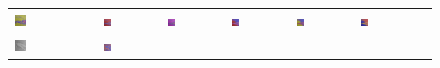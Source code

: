 \begin{figure}[h!]
\begin{tabular}{C{0.14\textwidth}C{0.14\textwidth}C{0.14\textwidth}C{0.14\textwidth}C{0.14\textwidth}C{0.14\textwidth}C{0.14\textwidth}}
		\includegraphics[width=0.14\textwidth]{images/gen/color_weight/p03_02.png_0.00.png} &
		\includegraphics[width=0.14\textwidth]{images/gen/color_weight/p03_02.png_0.33.png} &
		\includegraphics[width=0.14\textwidth]{images/gen/color_weight/p03_02.png_0.66.png} &
		\includegraphics[width=0.14\textwidth]{images/gen/color_weight/p03_02.png_1.00.png} &
		\includegraphics[width=0.14\textwidth]{images/gen/color_weight/p03_02.png_1.33.png} &
		\includegraphics[width=0.14\textwidth]{images/gen/color_weight/p03_02.png_1.66.png} \\
		\includegraphics[width=0.14\textwidth]{images/p03/p03_03.png} &
		\includegraphics[width=0.14\textwidth]{images/gen/color_weight/p03_03.png_0.00.png} &

\end{tabular}
\end{figure}
